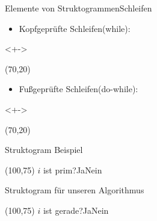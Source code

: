 \begin{frame}{Elemente von Struktogrammen}{Schleifen}
\begin{itemize}
    \item <+->Kopfgeprüfte Schleifen(while):
\end{itemize}
\begin{onlyenv}<+->
\begin{centernss}
\begin{struktogramm}(70,20)
    \whileend
\end{struktogramm}
\end{centernss}
\end{onlyenv}

\begin{itemize}
    \item <+->Fußgeprüfte Schleifen(do-while):
\end{itemize}
\begin{onlyenv}<+->
\begin{centernss}
\begin{struktogramm}(70,20)
    \untilend
\end{struktogramm}
\end{centernss}
\end{onlyenv}
\end{frame}

\begin{frame}{Struktogram Beispiel}
\begin{centernss}
\begin{struktogramm}(100,75)
            {\( i \) ist prim?}{Ja}{Nein}
            \change
        \ifend
    \untilend
\end{struktogramm}
\end{centernss}
\end{frame}

\begin{frame}{Struktogram für unseren Algorithmus}
\begin{centernss}
\begin{onlyenv}
\begin{struktogramm}(100,75)
            {\( i \) ist gerade?}{Ja}{Nein}
            \change
        \ifend
    \whileend
\end{struktogramm}
\end{onlyenv}
\end{centernss}
\end{frame}

